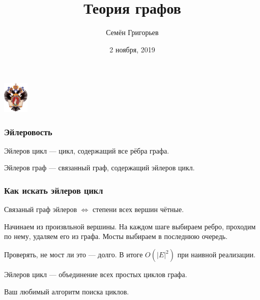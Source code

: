 \documentclass[xcolor=table]{beamer}
\title[Графы]{Теория графов}
\institute[СПбГУ]{
Санкт-Петербургский Государственный Университет
}
\author[Семён Григорьев]{Семён Григорьев}
\date{2 ноября, 2019}
\begin{document}
{
\begin{frame}[fragile]
  \centering
  \includegraphics[height=1.5cm]{pictures/SPbGU_Logo.png}
  \titlepage
\end{frame}
}

\begin{frame} \frametitle{Эйлеровость}
  
\begin{definition}
Эйлеров цикл --- цикл, содержащий все рёбра графа.
\end{definition}

\begin{definition}
Эйлеров граф --- связанный граф, содержащий эйлеров цикл.
\end{definition}


\begin{center}
\end{center}


\end{frame}


\begin{frame} \frametitle{Как искать эйлеров цикл}
  
\begin{theorem}
Связаный граф эйлеров $\iff$ степени всех вершин чётные.
\end{theorem}
\pause
\begin{definition}
Начинаем из произвльной вершины. На каждом шаге выбираем ребро, проходим по нему, удаляем его из графа. Мосты выбираем в последнюю очередь.
\end{definition}
Проверять, не мост ли это --- долго. В итоге $O(|E|^2)$  при наивной реализации.
\pause
\begin{definition}
Эйлеров цикл --- объединение всех простых циклов графа.

Ваш любимый алгоритм поиска циклов.
\end{definition}

\end{frame}
\end{document}
